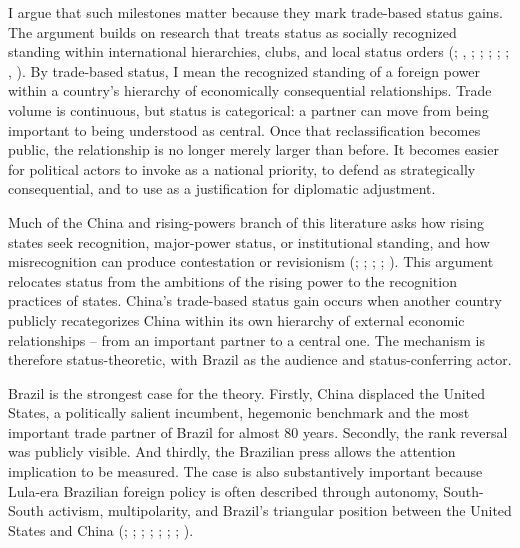 \documentclass[
  12pt,
]{article}
\begin{document}
I argue that such milestones matter because they mark trade-based status gains. The argument builds on research that treats status as socially recognized standing within international hierarchies, clubs, and local status orders (; , ; ; ; ; ; , ). By trade-based status, I mean the recognized standing of a foreign power within a country's hierarchy of economically consequential relationships. Trade volume is continuous, but status is categorical: a partner can move from being important to being understood as central. Once that reclassification becomes public, the relationship is no longer merely larger than before. It becomes easier for political actors to invoke as a national priority, to defend as strategically consequential, and to use as a justification for diplomatic adjustment.

Much of the China and rising-powers branch of this literature asks how rising states seek recognition, major-power status, or institutional standing, and how misrecognition can produce contestation or revisionism (; ; ; ; ). This argument relocates status from the ambitions of the rising power to the recognition practices of states. China's trade-based status gain occurs when another country publicly recategorizes China within its own hierarchy of external economic relationships -- from an important partner to a central one. The mechanism is therefore status-theoretic, with Brazil as the audience and status-conferring actor.

Brazil is the strongest case for the theory. Firstly, China displaced the United States, a politically salient incumbent, hegemonic benchmark and the most important trade partner of Brazil for almost 80 years. Secondly, the rank reversal was publicly visible. And thirdly, the Brazilian press allows the attention implication to be measured. The case is also substantively important because Lula-era Brazilian foreign policy is often described through autonomy, South-South activism, multipolarity, and Brazil's triangular position between the United States and China (; ; ; ; ; ; ; ).
\end{document}
